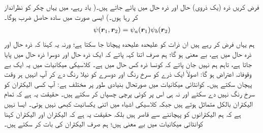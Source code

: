 فرض کریں ذرہ  (یک ذروی) حال  اور ذرہ  حال  میں پائے جاتے ہیں۔( یاد رہے، میں یہاں چکر کو نظرانداز کر رہا ہوں۔) ایسی صورت میں  سادہ حاصل ضرب ہوگا۔
\begin{align}
	\psi({{\boldsymbol{r}}}_1, {{\boldsymbol{r}}}_2)=\psi_a({{\boldsymbol{r}}}_1)\psi_b({{\boldsymbol{r}}}_2)
\end{align}
 ہم یہاں فرض کر رہے ہیں ان ذرات کو علیحدہ علیحدہ پہچانا جا سکتا ہے؛ ورنہ یہ کہنا کہ ذرہ  حال  اور ذرہ  حال  میں ہے، بے معنی ہو گا؛ ہم صرف اتنا کہہ پاتے کہ ایک ذرہ حال  اور دوسرا ذرہ حال  میں پایا جاتا ہے، تاہم ہم نہیں جان پاتے کہ کونسا ذرہ کس حال میں ہے۔ کلاسیکی میکانیات میں یہ ایک بے وقوفانہ اعتراض ہو گا: اصولاً ایک ذرے کو سرخ رنگ اور دوسرے کو نیلا رنگ دے کر آپ انہیں ہر وقت پہچان سکتے ہیں۔ کوانٹائی میکانیات میں صورتحال بنیادی طور پر مختلف ہے: آپ کسی الیکٹران کو سرخ رنگ نہیں دے سکتے اور نہ ہی اس پر کوئی پرچی چسپاں کر سکتے ہیں۔ حقیقت یہ ہے کہ تمام الیکٹران بالکل متماثل ہوتے ہیں جبکہ کلاسیکی اشیاء میں اتنی یکسانیت کبھی نہیں ہوتی۔ ایسا نہیں ہے کہ ہم الیکٹرانوں کو پہچاننے سے قاصر ہیں بلکہ حقیقت یہ ہے کہ الیکٹران اور  الیکٹران کہنا کوانٹائی میکانیات میں بے معنی ہیں؛ ہم صرف الیکٹران کی بات کر سکتے ہیں۔
 
